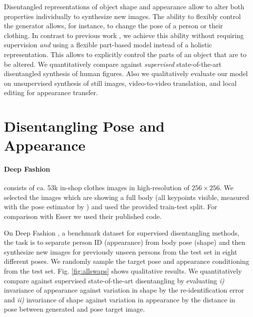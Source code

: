	Disentangled representations of object shape and appearance allow to alter both properties individually to synthesize new images. The ability to flexibly control the generator allows, for instance, to change the pose of a person or their clothing. In contrast to previous work \cite{esser18, denton17disvideo, ma17poseguided, ma17disperson, debem18dgpose, jakab18},
	we achieve this ability without requiring supervision \textit{and} using a flexible part-based model instead of a holistic representation. This allows to explicitly control the parts of an object that are to be altered. We quantitatively compare against \emph{supervised} state-of-the-art disentangled synthesis of human figures. Also we qualitatively evaluate our model on unsupervised synthesis of still images, video-to-video translation, and local editing for appearance transfer.

	\section{Disentangling Pose and Appearance}

	\paragraph{Deep Fashion} \cite{liu16deepfashion, liu16deepfashionwild} consists of ca. 53k in-shop clothes images in high-resolution of $256 \times 256$. We selected the images which are showing a full body (all keypoints visible, measured with the pose estimator by \cite{cao17affinityfield}) and used the provided train-test split. For comparison with Esser \etal \cite{esser18} we used their published code.

	On Deep Fashion \cite{liu16deepfashion, liu16deepfashionwild}, a benchmark dataset for supervised disentangling methods, the task is to separate person ID (appearance) from body pose (shape) and then synthesize new images for previously unseen persons from the test set in eight different poses. We randomly sample the target pose and appearance conditioning from the test set. Fig. \ref{fig:allswaps} shows qualitative results.
	We quantitatively compare against supervised state-of-the-art disentangling \cite{esser18} by evaluating \emph{i)} invariance of appearance against variation in shape by the re-identification error and \emph{ii)} invariance of shape against variation in appearance by the distance in pose between generated and pose target image.

